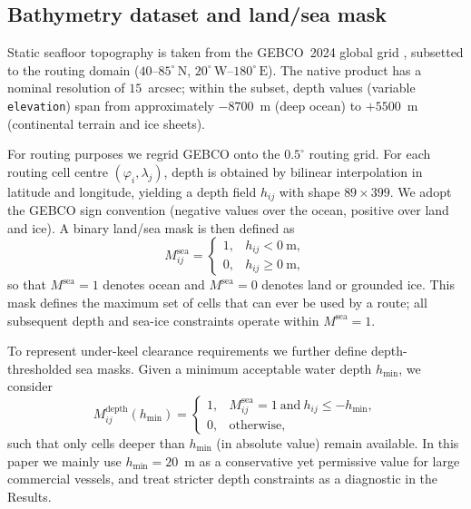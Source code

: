 \subsection{Bathymetry dataset and land/sea mask}
\label{sec:bathy_data}

Static seafloor topography is taken from the GEBCO~2024 global grid
\citep{GEBCO2024}, subsetted to the routing domain
($40$--$85^{\circ}\,\mathrm{N}$, $20^{\circ}\,\mathrm{W}$--$180^{\circ}\,\mathrm{E}$).
The native product has a nominal resolution of $15$~arcsec; within the
subset, depth values (variable \texttt{elevation}) span from
approximately $-8700$~m (deep ocean) to $+5500$~m (continental terrain
and ice sheets).

For routing purposes we regrid GEBCO onto the $0.5^{\circ}$ routing
grid. For each routing cell centre $(\varphi_i,\lambda_j)$, depth is
obtained by bilinear interpolation in latitude and longitude, yielding a
depth field $h_{ij}$ with shape $89 \times 399$. We adopt the GEBCO
sign convention (negative values over the ocean, positive over land and
ice). A binary land/sea mask is then defined as
\begin{equation}
  M^{\mathrm{sea}}_{ij} =
    \begin{cases}
      1, & h_{ij} < 0~\mathrm{m},\\[3pt]
      0, & h_{ij} \ge 0~\mathrm{m},
    \end{cases}
\end{equation}
so that $M^{\mathrm{sea}}=1$ denotes ocean and $M^{\mathrm{sea}}=0$
denotes land or grounded ice. This mask defines the maximum set of
cells that can ever be used by a route; all subsequent depth and sea-ice
constraints operate within $M^{\mathrm{sea}}=1$.

To represent under-keel clearance requirements we further define
depth-thresholded sea masks. Given a minimum acceptable water depth
$h_{\min}$, we consider
\begin{equation}
  M^{\mathrm{depth}}_{ij}(h_{\min}) =
    \begin{cases}
      1, & M^{\mathrm{sea}}_{ij}=1 \ \text{and}\ h_{ij} \le -h_{\min},\\[3pt]
      0, & \text{otherwise},
    \end{cases}
\label{eq:mdepth}
\end{equation}
such that only cells deeper than $h_{\min}$ (in absolute value) remain
available. In this paper we mainly use $h_{\min}=20$~m as a conservative
yet permissive value for large commercial vessels, and treat stricter
depth constraints as a diagnostic in the Results.

